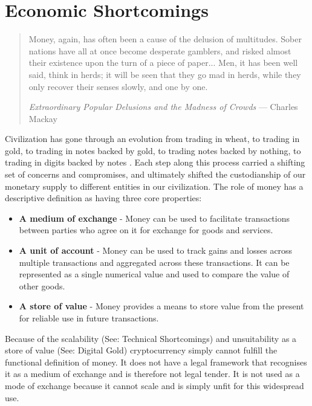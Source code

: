 \chapter{Economic Shortcomings}

\begin{quote}
Money, again, has often been a cause of the delusion of multitudes. Sober
nations have all at once become desperate gamblers, and risked almost their
existence upon the turn of a piece of paper... Men, it has been well said,
think in herds; it will be seen that they go mad in herds, while they only
recover their senses slowly, and one by one.
\begin{flushright}
  \textit{Extraordinary Popular Delusions and the Madness of Crowds} --- Charles Mackay
\end{flushright}
\end{quote}

Civilization has gone through an evolution from trading in wheat, to trading in
gold, to trading in notes backed by gold, to trading notes backed by nothing, to
trading in digits backed by notes \cite{eich_currency_2018}. Each step along
this process carried a shifting set of concerns and compromises, and ultimately
shifted the custodianship of our monetary supply to different entities in our
civilization.  The role of money has a descriptive definition as having three
core properties:

\begin{itemize}
\tightlist
\item
  \textbf{A medium of exchange} - Money can be used to facilitate transactions
  between parties who agree on it for exchange for goods and
  services.
\item
  \textbf{A unit of account} - Money can be used to track gains and losses across
  multiple transactions and aggregated across these transactions. It can be
  represented as a single numerical value and used to compare the value of
  other goods.
\item
  \textbf{A store of value} - Money provides a means to store value from the
  present for reliable use in future transactions.
\end{itemize}

Because of the scalability (See: Technical Shortcomings) and unsuitability as a
store of value (See: Digital Gold) cryptocurrency simply cannot fulfill the
functional definition of money. It does not have a legal framework that
recognises it as a medium of exchange and is therefore not legal tender.  It is
not used as a mode of exchange because it cannot scale and is simply unfit for
this widespread use. \cite{roubini2018exploring, budish2018economic}

